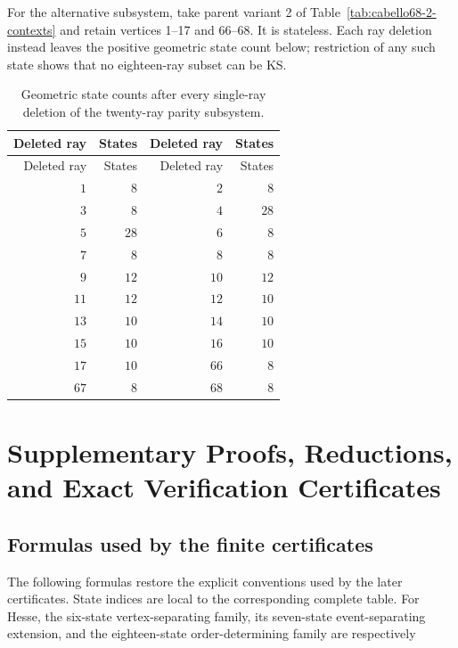 \documentclass[aps,pra,reprint,superscriptaddress,longbibliography,nofootinbib,floatfix,10pt]{revtex4-2}
\theoremstyle{definition}
\begin{document}
\endgroup
For the alternative subsystem, take parent variant 2 of Table~\ref{tab:cabello68-2-contexts} and retain vertices 1--17 and 66--68. It is stateless. Each ray deletion
instead leaves the positive geometric state count below; restriction
of any such state shows that no eighteen-ray subset can be KS.
\begingroup\small
{}
\begin{longtable}{rrrr}
\caption{Geometric state counts after every single-ray deletion of the twenty-ray parity subsystem.}\label{tab:cabello20-ray-criticality}\\
\toprule
Deleted ray & States & Deleted ray & States\\\midrule
\endfirsthead
\toprule
Deleted ray & States & Deleted ray & States\\\midrule
\endhead
\bottomrule\endfoot
\rule{0pt}{12pt}$1$ & $8$ & $2$ & $8$\\
\rule{0pt}{12pt}$3$ & $8$ & $4$ & $28$\\
\rule{0pt}{12pt}$5$ & $28$ & $6$ & $8$\\
\rule{0pt}{12pt}$7$ & $8$ & $8$ & $8$\\
\rule{0pt}{12pt}$9$ & $12$ & $10$ & $12$\\
\rule{0pt}{12pt}$11$ & $12$ & $12$ & $10$\\
\rule{0pt}{12pt}$13$ & $10$ & $14$ & $10$\\
\rule{0pt}{12pt}$15$ & $10$ & $16$ & $10$\\
\rule{0pt}{12pt}$17$ & $10$ & $66$ & $8$\\
\rule{0pt}{12pt}$67$ & $8$ & $68$ & $8$\\
\end{longtable}
\endgroup


\clearpage
\section{Supplementary Proofs, Reductions, and Exact Verification Certificates}\label{app:supplementary}

\subsection{Formulas used by the finite certificates}
The following formulas restore the explicit conventions used by the later certificates. State indices are local to the corresponding complete table. For Hesse, the six-state vertex-separating family, its seven-state event-separating extension, and the eighteen-state order-determining family are respectively
\end{document}
